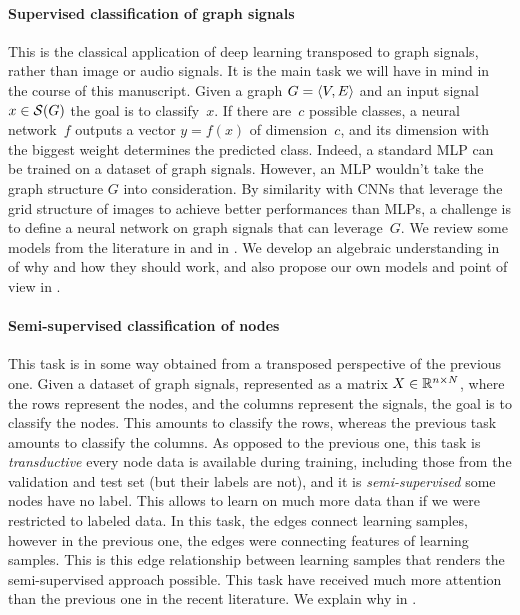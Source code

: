 \paragraph{Supervised classification of graph signals}
This is the classical application of deep learning transposed to graph signals, rather than image or audio signals. It is the main task we will have in mind in the course of this manuscript. Given a graph $G = \langle V, E \rangle$ and an input signal $x \in \mathcal{S}(G)$ the goal is to classify~$x$. If there are~$c$ possible classes, a neural network~$f$ outputs a vector $y = f(x)$ of dimension~$c$, and its dimension with the biggest weight determines the predicted class. Indeed, a standard MLP can be trained on a dataset of graph signals. However, an MLP wouldn't take the graph structure $G$ into consideration. By similarity with CNNs that leverage the grid structure of images to achieve better performances than MLPs, a challenge is to define a neural network on graph signals that can leverage~$G$. We review some models from the literature in  and in . We develop an algebraic understanding in  of why and how they should work, and also propose our own models and point of view in .

\paragraph{Semi-supervised classification of nodes}
This task is in some way obtained from a transposed perspective of the previous one. Given a dataset of graph signals, represented as a matrix $X \in \mathbb{R}^{n \times N}$, where the rows represent the nodes, and the columns represent the signals, the goal is to classify the nodes. This amounts to classify the rows, whereas the previous task amounts to classify the columns. As opposed to the previous one, this task is \emph{transductive} \ie every node data is available during training, including those from the validation and test set (but their labels are not), and it is \emph{semi-supervised} \ie some nodes have no label. This allows to learn on much more data than if we were restricted to labeled data. In this task, the edges connect learning samples, however in the previous one, the edges were connecting features of learning samples. This is this edge relationship between learning samples that renders the semi-supervised approach possible. This task have received much more attention than the previous one in the recent literature. We explain why in .


